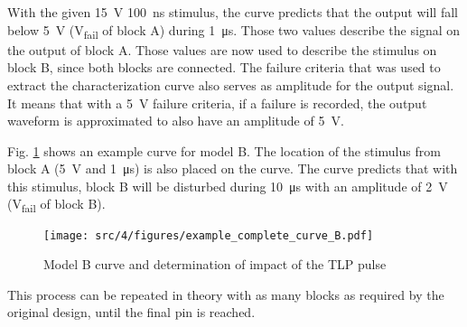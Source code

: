With the given \SI{15}{\volt} \SI{100}{\nano\second} stimulus, the curve predicts that the output will fall below \SI{5}{\volt} (V\textsubscript{fail} of block A) during \SI{1}{\micro\second}.
Those two values describe the signal on the output of block A.
Those values are now used to describe the stimulus on block B, since both blocks are connected.
The failure criteria that was used to extract the characterization curve also serves as amplitude for the output signal.
It means that with a \SI{5}{\volt} failure criteria, if a failure is recorded, the output waveform is approximated to also have an amplitude of \SI{5}{\volt}.

Fig. \ref{example_complete_curve_B} shows an example curve for model B.
The location of the stimulus from block A (\SI{5}{\volt} and \SI{1}{\micro\second}) is also placed on the curve.
The curve predicts that with this stimulus, block B will be disturbed during \SI{10}{\micro\second} with an amplitude of \SI{2}{\volt} (V\textsubscript{fail} of block B).

\begin{figure}[!h]
  \centering
  \texttt{[image: src/4/figures/example\_complete\_curve\_B.pdf]}
  \caption{Model B curve and determination of impact of the TLP pulse}
  \label{example_complete_curve_B}
\end{figure}

This process can be repeated in theory with as many blocks as required by the original design, until the final pin is reached.

